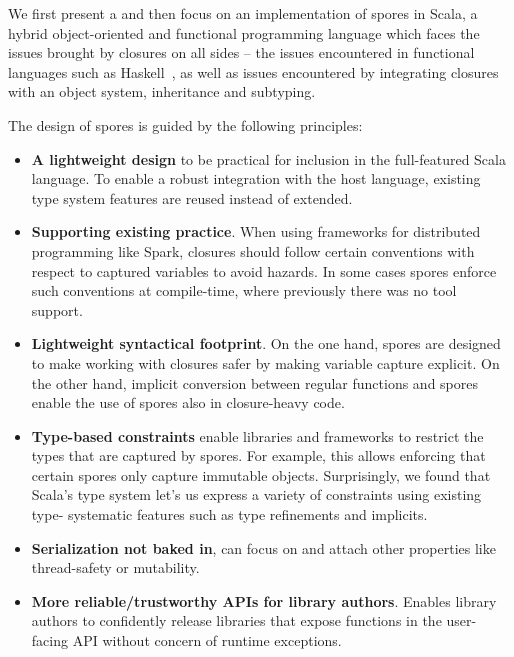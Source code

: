 \documentclass{llncs}
\begin{document}
We first present a and then focus on an implementation of spores in Scala, a
hybrid object-oriented and functional programming language which faces the
issues brought by closures on all sides -- the issues encountered in
functional languages such as Haskell~\cite{CloudHaskell}, as well as issues
encountered by integrating closures with an object system, inheritance and
subtyping.

The design of spores is guided by the following principles:
\begin{itemize}
\item {\bf A lightweight design} to be practical for inclusion in the 
full-featured Scala language. To enable a robust integration with the host
language, existing type system features are reused instead of extended.

\item {\bf Supporting existing practice}. When using frameworks for distributed
programming like Spark, closures should follow certain conventions with
respect to captured variables to avoid hazards. In some cases spores enforce
such conventions at compile-time, where previously there was no tool support.

\item {\bf Lightweight syntactical footprint}. On the one hand, spores are designed to
make working with closures safer by making variable capture explicit. On the
other hand, implicit conversion between regular functions and spores enable
the use of spores also in closure-heavy code.

\item {\bf Type-based constraints} enable libraries and frameworks to restrict the types
that are captured by spores. For example, this allows enforcing that certain
spores only capture immutable objects. Surprisingly, we found that Scala's
type system let's us express a variety of constraints using existing type-
systematic features such as type refinements and implicits.

\item {\bf Serialization not baked in}, can focus on and attach other properties
like thread-safety or mutability.

\item {\bf More reliable/trustworthy APIs for library authors}. Enables library
authors to confidently release libraries that expose functions in the user-
facing API without concern of runtime exceptions.
\end{itemize}

\end{document}
